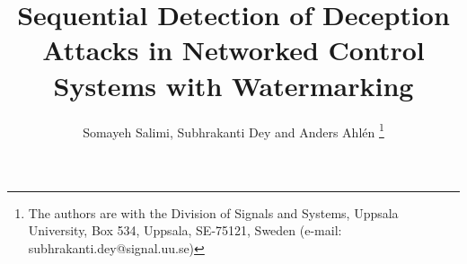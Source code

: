 \documentclass[journal,10pt]{IEEEtran}
\begin{document}

\title{Sequential Detection of Deception Attacks in Networked Control Systems with Watermarking}
\vspace{-1.7cm}
\author{Somayeh Salimi, Subhrakanti Dey and Anders Ahl\' en \thanks{The authors are with the Division of Signals and Systems, Uppsala University, Box 534, Uppsala, SE-75121, Sweden (e-mail: subhrakanti.dey@signal.uu.se)}%
}

\maketitle
\thispagestyle{empty}
\pagestyle{empty}

\maketitle
\vspace{-1.7cm}
\end{document}
